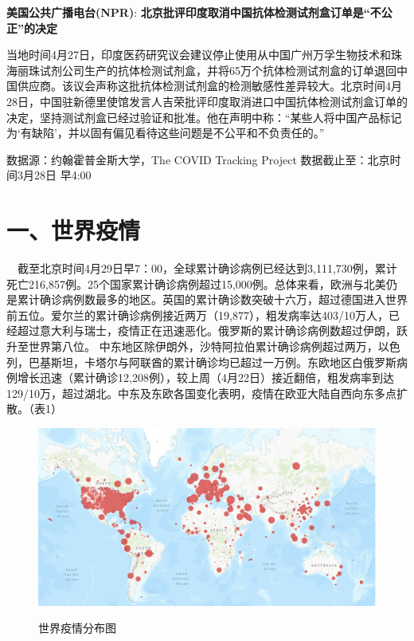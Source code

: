 \documentclass[]{article}
\begin{document}
\textbf{\textcolor{glaucous}{美国公共广播电台(NPR)}}:
\textbf{北京批评印度取消中国抗体检测试剂盒订单是``不公正''的决定}

当地时间4月27日，印度医药研究议会建议停止使用从中国广州万孚生物技术和珠海丽珠试剂公司生产的抗体检测试剂盒，并将65万个抗体检测试剂盒的订单退回中国供应商。该议会声称这批抗体检测试剂盒的检测敏感性差异较大。北京时间4月28日，中国驻新德里使馆发言人吉荣批评印度取消进口中国抗体检测试剂盒订单的决定，坚持测试剂盒已经过验证和批准。他在声明中称：``某些人将中国产品标记为`有缺陷'，并以固有偏见看待这些问题是不公平和不负责任的。''

\vspace{5mm}
%
  \noindent{}%

\begin{small}
{数据源：约翰霍普金斯大学，The COVID Tracking Project \quad   数据截止至：北京时间3月28日 早4:00}
\end{small}

\vspace{-7mm}

\hypertarget{section-2}{%
\section{\texorpdfstring{\textcolor{glaucous}{一、世界疫情}}{}}\label{section-2}}

\vspace{-5mm}

\(\quad\)截至北京时间4月29日早7：00，全球累计确诊病例已经达到3,111,730例，累计死亡216,857例。25个国家累计确诊病例超过15,000例。总体来看，欧洲与北美仍是累计确诊病例数最多的地区。英国的累计确诊数突破十六万，超过德国进入世界前五位。爱尔兰的累计确诊病例接近两万（19,877），粗发病率达403/10万人，已经超过意大利与瑞士，疫情正在迅速恶化。俄罗斯的累计确诊病例数超过伊朗，跃升至世界第八位。
中东地区除伊朗外，沙特阿拉伯累计确诊病例超过两万，以色列，巴基斯坦，卡塔尔与阿联酋的累计确诊均已超过一万例。东欧地区白俄罗斯病例增长迅速（累计确诊12,208例），较上周（4月22日）接近翻倍，粗发病率到达129/10万，超过湖北。中东及东欧各国变化表明，疫情在欧亚大陆自西向东多点扩散。（表1）

\begin{figure}[H]
\caption{世界疫情分布图} %
\centering
\includegraphics[]{./input/covid1.png} %
\label{} %
\end{figure}
\end{document}
